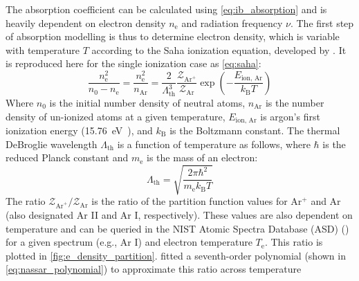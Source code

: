         The absorption coefficient can be calculated using \autoref{eq:ib_absorption} and is heavily dependent on electron density $n_\mathrm{e}$ and radiation frequency $\nu$. The first step of absorption modelling is thus to determine electron density, which is variable with temperature $T$ according to the Saha ionization equation, developed by \textcite{sahaPhysicalTheoryStellar1997}. It is reproduced here for the single ionization case as \autoref{eq:saha}:
        \begin{equation}
            \frac{n_\mathrm{e}^2}{n_0-n_\mathrm{e}} = \frac{n_\mathrm{e}^2}{n_\mathrm{Ar}} = \frac{2}{\Lambda_\mathrm{th}^3}\frac{\mathcal{Z}_{\mathrm{Ar}^+}}{\mathcal{Z}_\mathrm{Ar}}\exp{\left(-\frac{E_\text{ion, Ar}}{k_\mathrm{B}T}\right)}
            \label{eq:saha}
        \end{equation}
        Where $n_0$ is the initial number density of neutral atoms, $n_\mathrm{Ar}$ is the number density of un-ionized atoms at a given temperature, $E_\text{ion, Ar}$ is argon's first ionization energy (\qty{15.76}{eV}~\cite{liasIonizationEnergyEvaluation2023}), and $k_\mathrm{B}$ is the Boltzmann constant. The thermal DeBroglie wavelength $\Lambda_\mathrm{th}$ is a function of temperature as follows, where $\hbar$ is the reduced Planck constant and $m_\mathrm{e}$ is the mass of an electron:
        \begin{equation*}
            \Lambda_\mathrm{th} = \sqrt{\frac{2\pi \hbar^2}{m_\mathrm{e}k_\mathrm{B}T}}
        \end{equation*}
        The ratio $\mathcal{Z}_{\mathrm{Ar}^+}/\mathcal{Z}_\mathrm{Ar}$ is the ratio of the partition function values for Ar$^+$ and Ar (also designated Ar II and Ar I, respectively). These values are also dependent on temperature and can be queried in the NIST Atomic Spectra Database (ASD) (\textcite{kramidaNISTAtomicSpectra2022}) for a given spectrum (e.g., Ar I) and electron temperature $T_\mathrm{e}$. This ratio is plotted in \autoref{fig:e_density_partition}. \citeauthor{nassarInvestigationLasersustainedPlasma2012} fitted a seventh-order polynomial (shown in \autoref{eq:nassar_polynomial}) to approximate this ratio across temperature


